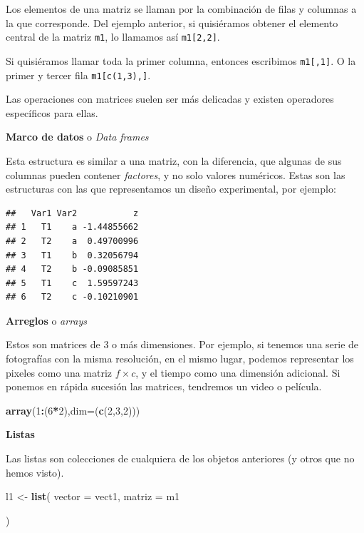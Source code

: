 \documentclass[12pt,letterpaper,]{book}
\newenvironment{Shaded}{\begin{snugshade}}{\end{snugshade}}
\newcommand{\KeywordTok}[1]{\textcolor[rgb]{0.13,0.29,0.53}{\textbf{#1}}}
\newcommand{\DataTypeTok}[1]{\textcolor[rgb]{0.13,0.29,0.53}{#1}}
\newcommand{\DecValTok}[1]{\textcolor[rgb]{0.00,0.00,0.81}{#1}}
\newcommand{\StringTok}[1]{\textcolor[rgb]{0.31,0.60,0.02}{#1}}
\newcommand{\OperatorTok}[1]{\textcolor[rgb]{0.81,0.36,0.00}{\textbf{#1}}}
\newcommand{\NormalTok}[1]{#1}
\begin{document}
Los elementos de una matriz se llaman por la combinación de filas y
columnas a la que corresponde. Del ejemplo anterior, si quisiéramos
obtener el elemento central de la matriz \texttt{m1}, lo llamamos así
\texttt{m1{[}2,2{]}}.

Si quisiéramos llamar toda la primer columna, entonces escribimos
\texttt{m1{[},1{]}}. O la primer y tercer fila \texttt{m1{[}c(1,3),{]}}.

Las operaciones con matrices suelen ser más delicadas y existen
operadores específicos para ellas.

\textbf{Marco de datos} o \emph{Data frames}

Esta estructura es similar a una matriz, con la diferencia, que algunas
de sus columnas pueden contener \emph{factores}, y no solo valores
numéricos. Estas son las estructuras con las que representamos un diseño
experimental, por ejemplo:

\begin{verbatim}
##   Var1 Var2           z
## 1   T1    a -1.44855662
## 2   T2    a  0.49700996
## 3   T1    b  0.32056794
## 4   T2    b -0.09085851
## 5   T1    c  1.59597243
## 6   T2    c -0.10210901
\end{verbatim}

\textbf{Arreglos} o \emph{arrays}

Estos son matrices de 3 o más dimensiones. Por ejemplo, si tenemos una
serie de fotografías con la misma resolución, en el mismo lugar, podemos
representar los pixeles como una matriz \(f\times c\), y el tiempo como
una dimensión adicional. Si ponemos en rápida sucesión las matrices,
tendremos un video o película.

\begin{Shaded}
\begin{Highlighting}[]
\KeywordTok{array}\NormalTok{(}\DecValTok{1}\OperatorTok{:}\NormalTok{(}\DecValTok{6}\OperatorTok{*}\DecValTok{2}\NormalTok{),}\DataTypeTok{dim=}\NormalTok{(}\KeywordTok{c}\NormalTok{(}\DecValTok{2}\NormalTok{,}\DecValTok{3}\NormalTok{,}\DecValTok{2}\NormalTok{)))}
\end{Highlighting}
\end{Shaded}

\textbf{Listas}

Las listas son colecciones de cualquiera de los objetos anteriores (y
otros que no hemos visto).

\begin{Shaded}
\begin{Highlighting}[]
\NormalTok{l1 <-}\StringTok{ }\KeywordTok{list}\NormalTok{(}
  \DataTypeTok{vector =}\NormalTok{ vect1,}
  \DataTypeTok{matriz =}\NormalTok{ m1}
  
\NormalTok{)}
\end{Highlighting}
\end{Shaded}
\end{document}
